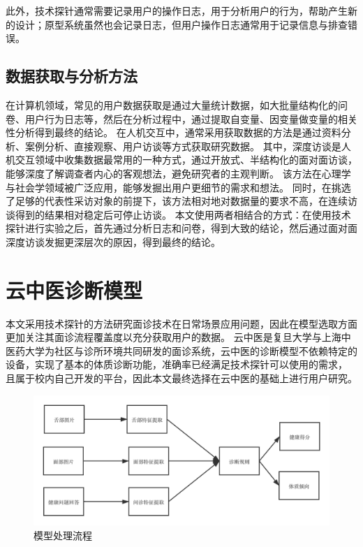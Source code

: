 此外，技术探针通常需要记录用户的操作日志，用于分析用户的行为，帮助产生新的设计；原型系统虽然也会记录日志，但用户操作日志通常用于记录信息与排查错误。

\subsection{数据获取与分析方法}
在计算机领域，常见的用户数据获取是通过大量统计数据，如大批量结构化的问卷、用户行为日志等，然后在分析过程中，通过提取自变量、因变量做变量的相关性分析得到最终的结论。
在人机交互中，通常采用获取数据的方法是通过资料分析、案例分析、直接观察、用户访谈等方式获取研究数据。
其中，深度访谈是人机交互领域中收集数据最常用的一种方式，通过开放式、半结构化的面对面访谈，能够深度了解调查者内心的客观想法，避免研究者的主观判断。
该方法在心理学与社会学领域被广泛应用，能够发掘出用户更细节的需求和想法。
同时，在挑选了足够的代表性采访对象的前提下，该方法相对地对数据量的要求不高，在连续访谈得到的结果相对稳定后可停止访谈\cite{cleary2014data}。
本文使用两者相结合的方式：在使用技术探针进行实验之后，首先通过分析日志和问卷，得到大致的结论，然后通过面对面深度访谈发掘更深层次的原因，得到最终的结论。

\section{云中医诊断模型}
本文采用技术探针的方法研究面诊技术在日常场景应用问题，因此在模型选取方面更加关注其面诊流程覆盖度以充分获取用户的数据。
云中医是复旦大学与上海中医药大学为社区与诊所环境共同研发的面诊系统，云中医的诊断模型不依赖特定的设备，实现了基本的体质诊断功能，准确率已经满足技术探针可以使用的需求，
且属于校内自己开发的平台，因此本文最终选择在云中医的基础上进行用户研究。

\begin{figure}[htb]
    \centering
    \includegraphics[width=15cm]{images/cloud_med3.png}
    \caption{模型处理流程}
    \label{fig:cloudmed1}
\end{figure}

